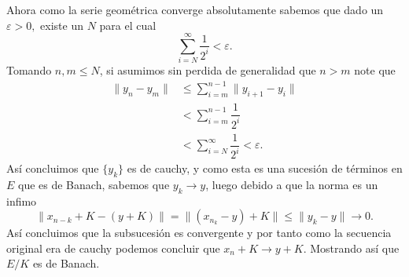 \begin{itemize}
\begin{itemize}
\begin{sproof}
             Ahora como la serie geométrica converge absolutamente sabemos que dado un $\varepsilon>0,$ existe un $N$ para el cual
             $$\sum_{i=N}^\infty\dfrac{1}{2^i}<\varepsilon.$$ 
             Tomando $n,m\leq N$, si asumimos sin perdida de generalidad que $n>m$ note que
             \begin{align*}
                 \|y_n-y_m\|&\leq \sum_{i=m}^{n-1}\|y_{i+1}-y_i\|\\
                &<\sum_{i=m}^{n-1}\dfrac{1}{2^i}\\
                &<\sum_{i=N}^\infty\dfrac{1}{2^i}<\varepsilon.
             \end{align*}
             Así concluimos que $\{y_k\}$ es de cauchy, y como esta es una sucesión de términos en $E$ que es de Banach, sabemos que $y_k\to y$, luego debido a que la norma es un infimo
             $$\|x_{n-k}+K-(y+K)\|=\|(x_{n_k}-y)+K\|\leq \|y_k-y\|\to 0.$$
             Así concluimos que la subsucesión es convergente y por tanto como la secuencia original era de cauchy podemos concluir que $x_n+K\to y+K.$ Mostrando así que $E/K$ es de Banach.


\end{sproof}
\end{itemize}
\end{itemize}
